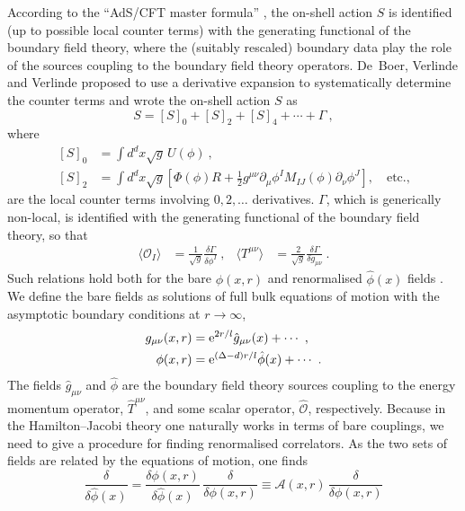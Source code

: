 \documentclass[a4paper,12pt]{article}
\begin{document}
According to the ``AdS/CFT master formula''
\cite{Gubser98-1,Witten98-1}, the on-shell action $S$ is identified
(up to possible local counter terms) with the generating functional of
the boundary field theory, where the (suitably rescaled) boundary data
play the role of the sources coupling to the boundary field theory operators. 
De~Boer, Verlinde and Verlinde \cite{deBoer00a} proposed to
use a derivative expansion to systematically determine the counter
terms and wrote the on-shell action $S$ as 
\begin{equation}
\label{review:S}
  S = [S]_0 + [S]_2 + [S]_4 +\cdots + \Gamma~,
\end{equation}
where 
\begin{align}
\label{review:S0}
  [S]_0 &= \int d^dx\sqrt{g}\, U(\phi)~,\\ 
\label{review:S2}
  [S]_2 &= \int d^dx\sqrt{g} \left[\Phi(\phi) R + \frac12
  g^{\mu\nu} \partial_\mu \phi^I M_{IJ}(\phi) \partial_\nu \phi^J
  \right], \quad \text{etc.,}
\end{align} 
are the local counter terms involving $0,2,\ldots$ derivatives.
$\Gamma$, which is generically non-local, is identified with the
generating functional of the boundary field theory, so that
\begin{align}
\label{review:T}
\langle\mathcal{O}_I \rangle &= \frac1{\sqrt{g}} \frac{\delta
\Gamma}{\delta \phi^I}~, &
\langle T^{\mu\nu} \rangle &= \frac2{\sqrt{g}} \frac{\delta
\Gamma}{\delta g_{\mu\nu}}~.
\end{align}
Such relations hold both for the bare $\phi(x,r)$  and renormalised 
$\hat\phi(x)$ fields \cite{deBoer00a}. We define the bare fields as 
solutions of full bulk equations of motion with the asymptotic 
boundary conditions at $r\to \infty$,
\begin{align}
\label{review:asym1}
  g_{\mu\nu}(x,r) &= \mathrm{e}^{2r/l} \hat{g}_{\mu\nu}(x) + \cdots~,\\
\label{review:asym2}
  \phi(x,r) &= \mathrm{e}^{(\Delta-d)r/l} \hat{\phi}(x) +\cdots~.
\end{align}
The fields $\hat{g}_{\mu\nu}$ and $\hat{\phi}$ are the boundary
field theory sources coupling to the energy momentum operator,
$\hat{T}^{\mu\nu}$, and some scalar operator, $\hat{\mathcal{O}}$,
respectively. 
Because in the Hamilton--Jacobi theory one naturally works in terms of 
bare couplings, we need to give a procedure for finding renormalised  
correlators. As the two sets of 
fields are related by the equations of motion, one finds
\begin{equation}
\label{jacob}
  \frac{\delta}{\delta \hat\phi(x)} = \frac{\delta \phi(x,r)}{\delta 
  \hat\phi(x)}\,  \frac{\delta}{\delta \phi(x,r)} \equiv 
  \mathcal{A}(x,r)\,  \frac{\delta}{\delta \phi(x,r)} 
\end{equation}
\end{document}
